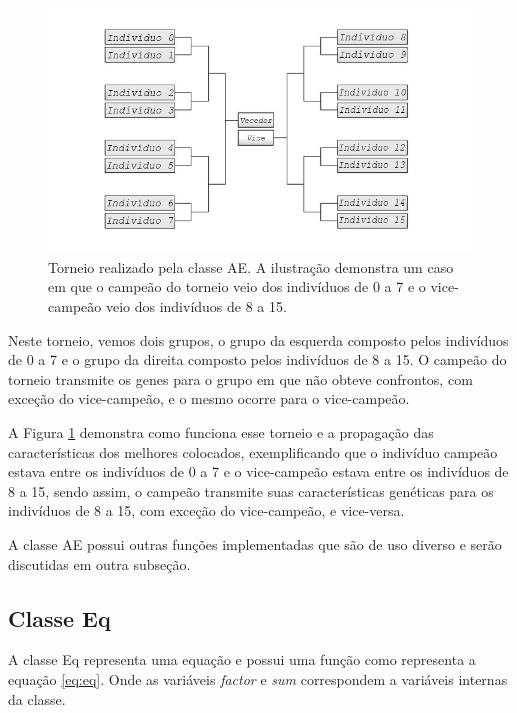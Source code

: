 \begin{figure}[htb]
    \caption{Torneio realizado pela classe AE. A ilustração demonstra um caso em que o campeão do torneio veio dos indivíduos de 0 a 7 e o vice-campeão veio dos indivíduos de 8 a 15.}
    \label{figura:funcao_playAll}
    \centering
    \includegraphics[scale=0.8]{images/ps/mata-mata}
    \fautor
\end{figure}

Neste torneio, vemos dois grupos, o grupo da esquerda composto pelos indivíduos de 0 a 7 e o grupo da direita composto pelos indivíduos de 8 a 15. O campeão do torneio transmite os genes para o grupo em que não obteve confrontos, com exceção do vice-campeão, e o mesmo ocorre para o vice-campeão.

A Figura \ref{figura:funcao_playAll} demonstra como funciona esse torneio e a propagação das características dos melhores colocados, exemplificando que o indivíduo campeão estava entre os indivíduos de 0 a 7 e o vice-campeão estava entre os indivíduos de 8 a 15, sendo assim, o campeão transmite suas características genéticas para os indivíduos de 8 a 15, com exceção do vice-campeão, e vice-versa.

A classe AE possui outras funções implementadas que são de uso diverso e serão discutidas em outra subseção.

\subsection{Classe Eq}

\newcommand{\var}[1]{\textit{#1}}

A classe Eq representa uma equação e possui uma função como representa a equação \ref{eq:eq}. Onde as variáveis \var{factor} e \var{sum} correspondem a variáveis internas da classe.

